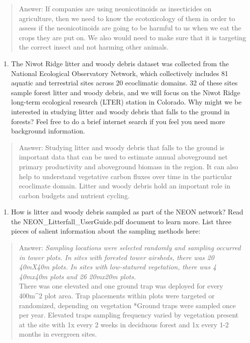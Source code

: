 \documentclass[]{article}
\providecommand{\tightlist}{%
  \setlength{\itemsep}{0pt}\setlength{\parskip}{0pt}}
\begin{document}
\begin{quote}
Answer: If companies are using neonicotinoids as insecticides on
agriculture, then we need to know the ecotoxicology of them in order to
assess if the neonicotinoids are going to be harmful to us when we eat
the crops they are put on. We also would need to make sure that it is
targeting the correct insect and not harming other animals.
\end{quote}

\begin{enumerate}
\def\labelenumi{\arabic{enumi}.}
\setcounter{enumi}{2}
\tightlist
\item
  The Niwot Ridge litter and woody debris dataset was collected from the
  National Ecological Observatory Network, which collectively includes
  81 aquatic and terrestrial sites across 20 ecoclimatic domains. 32 of
  these sites sample forest litter and woody debris, and we will focus
  on the Niwot Ridge long-term ecological research (LTER) station in
  Colorado. Why might we be interested in studying litter and woody
  debris that falls to the ground in forests? Feel free to do a brief
  internet search if you feel you need more background information.
\end{enumerate}

\begin{quote}
Answer: Studying litter and woody debris that falls to the ground is
important data that can be used to estimate annual aboveground net
primary productivity and aboveground biomass in the region. It can also
help to understand vegetative carbon fluxes over time in the particular
ecoclimate domain. Litter and woody debris hold an important role in
carbon budgets and nutrient cycling.
\end{quote}

\begin{enumerate}
\def\labelenumi{\arabic{enumi}.}
\setcounter{enumi}{3}
\tightlist
\item
  How is litter and woody debris sampled as part of the NEON network?
  Read the NEON\_Litterfall\_UserGuide.pdf document to learn more. List
  three pieces of salient information about the sampling methods here:
\end{enumerate}

\begin{quote}
Answer: \emph{Sampling locations were selected randomly and sampling
occurred in tower plots. In sites with forested tower airsheds, there
was 20 40mX40m plots. In sites with low-statured vegetation, there was 4
40mx40m plots and 26 20mx20m plots.\\
}There was one elevated and one ground trap was deployed for every
400m\^{}2 plot area. Trap placements within plots were targeted or
randomized, depending on vegetation *Ground traps were sampled once per
year. Elevated traps sampling frequency varied by vegetation present at
the site with 1x every 2 weeks in deciduous forest and 1x every 1-2
months in evergreen sites.
\end{quote}
\end{document}
